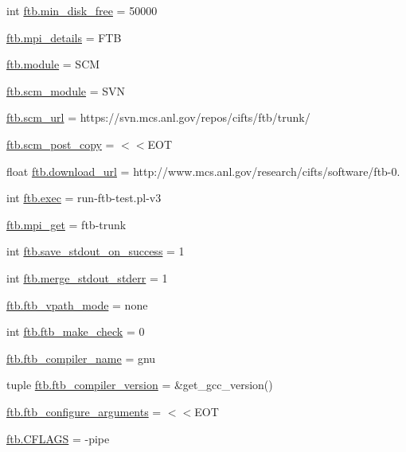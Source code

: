 \begin{DoxyCompactItemize}
\item 
int \hyperlink{namespaceftb_a6e146aa10e5dfce9215588877f36147e}{ftb.\-min\-\_\-disk\-\_\-free} = 50000
\item 
\hyperlink{namespaceftb_a8c62412466f196971725835c110873a2}{ftb.\-mpi\-\_\-details} = F\-T\-B
\item 
\hyperlink{namespaceftb_a06ea752188762f1575ad0dd65835373a}{ftb.\-module} = S\-C\-M
\item 
\hyperlink{namespaceftb_a26a832e4479187da7d76e4b52ec65ba0}{ftb.\-scm\-\_\-module} = S\-V\-N
\item 
\hyperlink{namespaceftb_a026e23a3b319d0b23c51013f5ef52090}{ftb.\-scm\-\_\-url} = https\-://svn.\-mcs.\-anl.\-gov/repos/cifts/ftb/trunk/
\item 
\hyperlink{namespaceftb_a4d7198772f78b31a4983c1dac25046e0}{ftb.\-scm\-\_\-post\-\_\-copy} = $<$$<$E\-O\-T
\item 
float \hyperlink{namespaceftb_ae96f515f42a6de5c342c0349668b1935}{ftb.\-download\-\_\-url} = http\-://www.\-mcs.\-anl.\-gov/research/cifts/software/ftb-\/0.
\item 
int \hyperlink{namespaceftb_a3708045a4f84247896c658014c72ec9b}{ftb.\-exec} = run-\/ftb-\/test.\-pl-\/v3
\item 
\hyperlink{namespaceftb_a398d20136ddd939bd203235b0dce9863}{ftb.\-mpi\-\_\-get} = ftb-\/trunk
\item 
int \hyperlink{namespaceftb_a1ec5d4a20c1eb705891e7dd81a73cd7f}{ftb.\-save\-\_\-stdout\-\_\-on\-\_\-success} = 1
\item 
int \hyperlink{namespaceftb_afd8660b1540ea079259bfe7501017590}{ftb.\-merge\-\_\-stdout\-\_\-stderr} = 1
\item 
\hyperlink{namespaceftb_ae1812ef9e1c7b0cc8fe32bc1183e452d}{ftb.\-ftb\-\_\-vpath\-\_\-mode} = none
\item 
int \hyperlink{namespaceftb_a802fd0e9b4205267172fbff8637bc8ae}{ftb.\-ftb\-\_\-make\-\_\-check} = 0
\item 
\hyperlink{namespaceftb_ac13591e7257052189dfc8d0b56084713}{ftb.\-ftb\-\_\-compiler\-\_\-name} = gnu
\item 
tuple \hyperlink{namespaceftb_a13bb6a052d4b7f9fcd48889879cf31e9}{ftb.\-ftb\-\_\-compiler\-\_\-version} = \&get\-\_\-gcc\-\_\-version()
\item 
\hyperlink{namespaceftb_ad086734056187d957ce104223812ec44}{ftb.\-ftb\-\_\-configure\-\_\-arguments} = $<$$<$E\-O\-T
\item 
\hyperlink{namespaceftb_ac8a70036199459a6c1c0582d012b447c}{ftb.\-C\-F\-L\-A\-G\-S} = -\/pipe

\end{DoxyCompactItemize}

